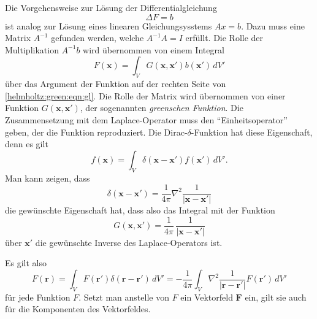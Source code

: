 Die Vorgehensweise zur Lösung der Differentialgleichung
\begin{equation}
\Delta F = b
\label{helmholtz:green:eqn:gl}
\end{equation}
ist analog zur Lösung eines linearen Gleichungsysstems
$Ax=b$.
Dazu muss eine Matrix $A^{-1}$ gefunden werden, welche $A^{-1}A=I$
erfüllt.
Die Rolle der Multiplikation $A^{-1}b$ wird übernommen von einem
Integral
\[
F(\boldsymbol{x})
=
\int_V
G(\boldsymbol{x},\boldsymbol{x}')
b(\boldsymbol{x}')
\,dV'
\]
über das Argument der Funktion auf der rechten Seite von
\eqref{helmholtz:green:eqn:gl}.
Die Rolle der Matrix wird übernommen von einer Funktion
$G(\boldsymbol{x},\boldsymbol{x}')$, der sogenannten
\emph{greenschen Funktion}.
Die Zusammensetzung mit dem Laplace-Operator muss den ``Einheitsoperator''
geben, der die Funktion reproduziert.
Die Dirac-$\delta$-Funktion hat diese Eigenschaft, denn es gilt
\[
f(\boldsymbol{x})
=
\int_V
\delta(\boldsymbol{x}-\boldsymbol{x}')
f(\boldsymbol{x}')
\,dV'.
\]
Man kann zeigen, dass 
\[
\delta(\boldsymbol{x}-\boldsymbol{x}')
=
\frac{1}{4\pi} \nabla^2 \frac{1}{|\boldsymbol{x}-\boldsymbol{x}'|}
\]
die gewünschte Eigenschaft hat,
dass also das Integral mit der Funktion
\[
G(\boldsymbol{x},\boldsymbol{x}')
=
\frac{1}{4\pi}\,
\frac{1}{|\boldsymbol{x}-\boldsymbol{x}'|}
\]
über $\boldsymbol{x}'$ die gewünschte Inverse des Laplace-Operators ist.
%
%

Es gilt also
\[
F(\boldsymbol{r})
=
\int_V
F(\boldsymbol{r}')
\delta(\boldsymbol{r}-\boldsymbol{r}')
\,dV'
=
-\frac{1}{4\pi}
\int_V
\nabla^2 \frac{1}{|\boldsymbol{r}-\boldsymbol{r}'|}
F(\boldsymbol{r}')
\,dV'
\]
für jede Funktion $F$.
Setzt man anstelle von $F$ ein Vektorfeld $\boldsymbol{F}$ ein, gilt
sie auch für die Komponenten des Vektorfeldes.


